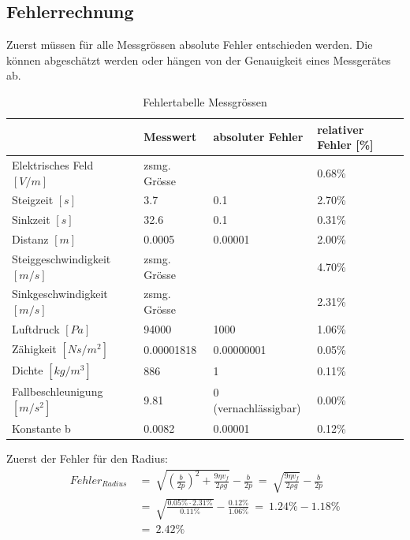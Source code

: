 \subsection{Fehlerrechnung}\label{sub:fehler}
Zuerst müssen für alle Messgrössen absolute Fehler entschieden werden. Die können abgeschätzt werden oder hängen von der Genauigkeit eines Messgerätes ab.

\begin{table}[h]
	\begin{center}
		\begin{tabular}{l|lll}
			                             & Messwert     & absoluter Fehler     & relativer Fehler [\%] \\ \toprule
			Elektrisches Feld $[V/m]$    & zsmg. Grösse &                      & 0.68\%                \\
			Steigzeit $[s]$              & 3.7          & 0.1                  & 2.70\%                \\
			Sinkzeit $[s]$               & 32.6         & 0.1                  & 0.31\%                \\
			Distanz $[m]$                & 0.0005       & 0.00001              & 2.00\%                \\
			Steiggeschwindigkeit $[m/s]$ & zsmg. Grösse &                      & 4.70\%                \\
			Sinkgeschwindigkeit $[m/s]$  & zsmg. Grösse &                      & 2.31\%                \\
			Luftdruck $[Pa]$             & 94000        & 1000                 & 1.06\%                \\
			Zähigkeit $[Ns/m^2]$         & 0.00001818   & 0.00000001           & 0.05\%                \\
			Dichte $[kg/m^3]$            & 886          & 1                    & 0.11\%                \\
			Fallbeschleunigung $[m/s^2]$ & 9.81         & 0 (vernachlässigbar) & 0.00\%                \\
			Konstante b                  & 0.0082       & 0.00001              & 0.12\%
		\end{tabular}
	\end{center}
	\caption{Fehlertabelle Messgrössen}
	\label{tab:messabsFehler}
\end{table}

\noindent Zuerst der Fehler für den Radius:
\begin{equation*}\label{eq:fehlerRadius}
	\begin{split}
		Fehler_{Radius} & \ = \ \sqrt{\left( \frac{b}{2p}\right)^2 + \frac{9\eta v_f}{2\rho g}} - \frac{b}{2p} \ = \ \sqrt{\frac{9\eta v_f}{2\rho g}} - \frac{b}{2p} \\
		                & \ = \ \sqrt{\frac{0.05\% \cdot 2.31\%}{0.11\%}} - \frac{0.12\%}{1.06\%} \ = \ 1.24\% - 1.18\%                                              \\
		                & \ = \ 2.42\%
	\end{split}
\end{equation*}

